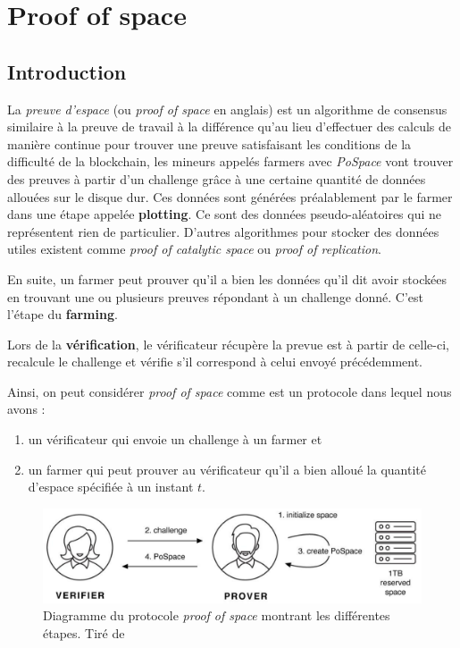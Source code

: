 \documentclass[../tb_report.tex]{subfiles}
\begin{document}
\chapter{Proof of space}
\label{ch:pospace}

\section{Introduction}

La \emph{preuve d'espace} (ou \emph{proof of space} en anglais) est un algorithme de consensus similaire à la preuve de travail à la différence qu'au lieu d'effectuer des calculs de manière continue pour trouver une preuve satisfaisant les conditions de la difficulté de la blockchain, les mineurs appelés farmers avec \emph{PoSpace} vont trouver des preuves à partir d'un challenge grâce à une certaine quantité de données allouées sur le disque dur. Ces données sont générées préalablement par le farmer dans une étape appelée \textbf{plotting}. Ce sont des données pseudo-aléatoires qui ne représentent rien de particulier. D'autres algorithmes pour stocker des données utiles existent comme \emph{proof of catalytic space} ou \emph{proof of replication}.

En suite, un farmer peut prouver qu'il a bien les données qu'il dit avoir stockées en trouvant une ou plusieurs preuves répondant à un challenge donné. C'est l'étape du \textbf{farming}.

Lors de la \textbf{vérification}, le vérificateur récupère la prevue est à partir de celle-ci, recalcule le challenge et vérifie s'il correspond à celui envoyé précédemment.

Ainsi, on peut considérer \emph{proof of space} comme est un protocole dans lequel nous avons :

\begin{enumerate}
  \item un vérificateur qui envoie un challenge à un farmer et
  \item un farmer qui peut prouver au vérificateur qu'il a bien alloué la quantité d'espace spécifiée à un instant $t$.
\end{enumerate}

\begin{figure}[H]
  \centering
  \includegraphics[width=\textwidth]{images/pospace.png}
  \caption{Diagramme du protocole \emph{proof of space} montrant les différentes étapes. Tiré de \cite{chia:consensus}}
\end{figure}
\end{document}
